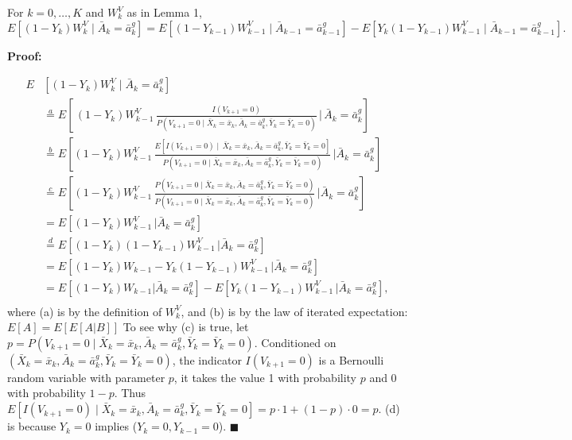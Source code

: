 \begin{tcolorbox}[title=Theorem 1: IPW Lemma 2]
For \(k = 0, \ldots, K\) and \(W_k^V\) as in Lemma 1,
\[
E[(1 - Y_k)W_k^V\mid \bar{A}_k = \bar{a}^g_k] = E[(1 - Y_{k-1})W_{k-1}^V\mid \bar{A}_{k-1} = \bar{a}^g_{k-1}] - E[Y_k(1 - Y_{k-1})W_{k-1}^V\mid \bar{A}_{k-1} = \bar{a}^g_{k-1}].
\]
\end{tcolorbox}

\textbf{Proof:}

\begin{align*}
E&[(1 - Y_k)W_k^V\mid \bar{A}_k = \bar{a}^g_k] \\
&\stackrel{a}{=}  E\!\left[\,(1 - Y_k)W_{k-1}^V \, \frac{I(V_{k+1} = 0)}{P(V_{k+1} = 0\mid \bar{X}_k=\bar{x}_k, \bar{A}_k = \bar{a}^g_k, \bar{Y}_k = \bar{Y}_k=0)} \,\Bigg|\, \bar{A}_k = \bar{a}^g_k\right]\\
&\stackrel{b}{=}  E\!\left[(1 - Y_k)W_{k-1}^V\,\frac{E\![I(V_{k+1} = 0) \mid\, \bar{X}_k=\bar{x}_k, \bar{A}_k = \bar{a}^g_k, \bar{Y}_k = \bar{Y}_k=0]}{P(V_{k+1} = 0\mid \bar{X}_k=\bar{x}_k, \bar{A}_k = \bar{a}^g_k, \bar{Y}_k = \bar{Y}_k=0)} \,\Big|\bar{A}_k = \bar{a}^g_k\right] \\
&\stackrel{c}{=}  E\!\left[(1 - Y_k)W_{k-1}^V\,\frac{P(V_{k+1} = 0\mid \bar{X}_k=\bar{x}_k, \bar{A}_k = \bar{a}^g_k, \bar{Y}_k = \bar{Y}_k=0)}{P(V_{k+1} = 0\mid \bar{X}_k=\bar{x}_k, \bar{A}_k = \bar{a}^g_k, \bar{Y}_k = \bar{Y}_k=0)} \,\Big|\bar{A}_k = \bar{a}^g_k\right] \\
&=  E\!\left[(1 - Y_k)W_{k-1}^V\,\Big|\bar{A}_k = \bar{a}^g_k\right] \\
&\stackrel{d}=  E\!\left[(1 - Y_k)(1-Y_{k-1})W_{k-1}^V\,\Big|\bar{A}_k = \bar{a}^g_k\right] \\
 &=  E\!\left[(1 - Y_k)W_{k-1} - Y_k (1-Y_{k-1})W_{k-1}^V\,\Big|\bar{A}_k = \bar{a}^g_k\right] \\
&=  E\!\left[(1 - Y_k)W_{k-1}\Big|\bar{A}_k = \bar{a}^g_k\right] -E\!\left[ Y_k (1-Y_{k-1})W_{k-1}^V\,\Big|\bar{A}_k = \bar{a}^g_k\right], \\
\end{align*}
where (a) is by the definition of $W_{k}^V$, and (b) is by the law of iterated expectation: $E[A] = E[E[A|B]]$ To see why (c) is true, let $p = P(V_{k+1} = 0 \mid \bar{X}_k=\bar{x}_k, \bar{A}_k = \bar{a}^g_k, \bar{Y}_k = \bar{Y}_k=0)$. Conditioned on \((\bar{X}_k=\bar{x}_k, \bar{A}_k = \bar{a}^g_k, \bar{Y}_k = \bar{Y}_k=0)\), the indicator \(I(V_{k+1} = 0)\) is a Bernoulli random variable with parameter \(p\), it takes the value 1 with probability \(p\) and 0 with probability \(1-p\). Thus $ E\!\left[I(V_{k+1} = 0)\mid \bar{X}_k=\bar{x}_k, \bar{A}_k = \bar{a}^g_k, \bar{Y}_k = \bar{Y}_k=0\right] = p\cdot 1 + (1-p)\cdot0 = p$.
(d) is because $Y_k=0$ implies ($Y_k=0,Y_{k-1}=0$). \(\blacksquare\)
